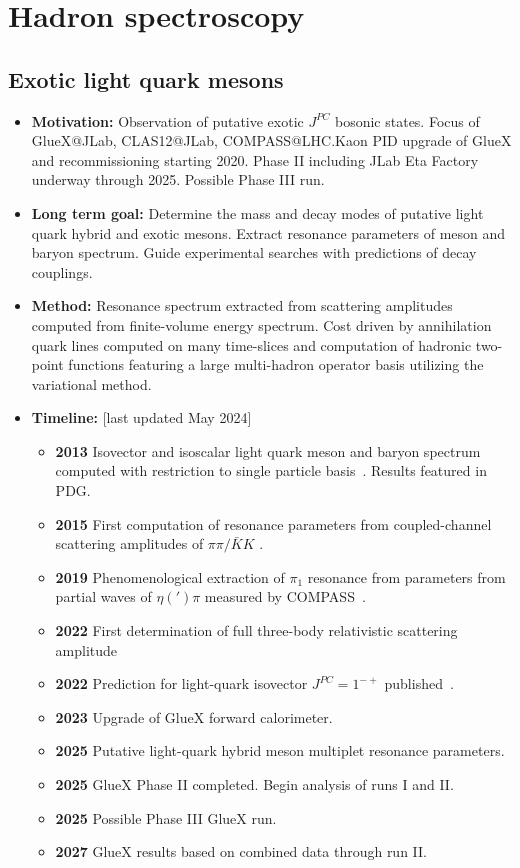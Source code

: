 \documentclass[12pt,hyperpdf]{article}
\begin{document}
\section{Hadron spectroscopy}\label{sec:hadspec}

\subsection{Exotic light quark mesons}
\begin{itemize}
    \item{\bf Motivation:} Observation of putative exotic $J^{PC}$ bosonic
      states. Focus of GlueX@JLab, CLAS12@JLab, COMPASS@LHC.Kaon PID
      upgrade of GlueX and recommissioning starting 2020. Phase II
      including JLab Eta Factory underway through 2025. Possible Phase
      III run.  
    \item{\bf Long term goal:} Determine the mass and decay modes of
      putative light quark hybrid and exotic mesons. Extract resonance
      parameters of meson and baryon spectrum. Guide experimental
      searches with predictions of decay couplings.
    \item{\bf Method:} Resonance spectrum extracted from scattering
      amplitudes computed from finite-volume energy spectrum. Cost
      driven by annihilation quark lines computed on many
      time-slices and computation of hadronic two-point functions
      featuring a large multi-hadron operator basis utilizing the variational method. 
\item{\bf Timeline:} \hfill [last updated May 2024]
\begin{itemize}
    \item{\bf 2013} Isovector and isoscalar light quark meson and baryon
      spectrum computed with restriction to single particle basis~\cite{Dudek:2013yja}. Results featured in PDG.
    \item{\bf 2015} First computation of resonance parameters from coupled-channel scattering
      amplitudes of $\pi\pi/\bar{K}K$ \cite{Wilson:2015dqa}.
    \item{\bf 2019} Phenomenological extraction of $\pi_1$ resonance from 
      parameters from partial waves of $\eta(')\pi$ measured by COMPASS~\cite{JPAC:2018zyd}.
    \item{\bf 2022} First determination of full three-body relativistic scattering amplitude~\cite{Hansen:2020otl}
    \item{\bf 2022} Prediction for light-quark isovector $J^{PC}=1^{-+}$ published~\cite{Woss:2020ayi}.
    \item{\bf 2023} Upgrade of GlueX forward calorimeter.
    \item{\bf 2025} Putative light-quark hybrid meson multiplet resonance parameters.
    \item{\bf 2025} GlueX Phase II completed. Begin analysis of runs I and II. 
    \item{\bf 2025} Possible Phase III GlueX run.
    \item{\bf 2027} GlueX results based on combined data through run II.
\end{itemize}
\end{itemize}
\end{document}
